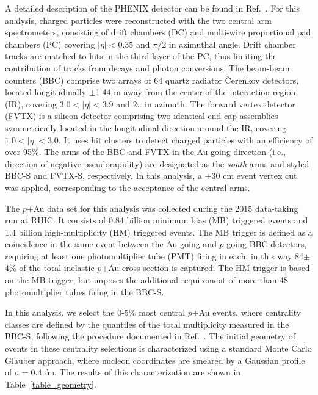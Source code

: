 \documentclass[%
reprint,
showpacs,preprintnumbers,
 amsmath,amssymb,
 aps,
]{revtex4-1}
\newcommand{\pau}{\mbox{$p$+Au}\xspace}
\newcommand{\bbceta}{\mbox{$3.0<|\eta|<3.9$}\xspace}
\begin{document}
A detailed description of the PHENIX detector can be found in Ref.~\cite{Adcox2003469}. For this analysis, charged particles were reconstructed with the two central arm spectrometers, consisting of drift chambers (DC) and multi-wire proportional pad chambers (PC) covering $|\eta|<0.35$ and $\pi/2$ in azimuthal angle. Drift chamber tracks are matched to hits in the third layer of the PC, thus limiting the contribution of tracks from decays and photon conversions. The beam-beam counters (BBC) comprise two arrays of 64 quartz radiator \v{C}erenkov detectors, located longitudinally $\pm$1.44 m away from the center of the interaction region (IR), covering \bbceta and 2$\pi$ in azimuth. The forward vertex detector (FVTX) is a silicon detector comprising two identical end-cap assemblies symmetrically located in the longitudinal direction around the IR, covering $1.0 < |\eta| < 3.0$. It uses hit clusters to detect charged particles with an efficiency of over 95\%.
The arms of the BBC and FVTX in the Au-going direction (i.e., direction of negative pseudorapidity) are designated as the \emph{south} arms and styled BBC-S and FVTX-S, respectively. In this analysis, a $\pm$30 cm event vertex cut was applied, corresponding to the acceptance of the central arms. 

The \pau data set for this analysis was collected during the 2015 data-taking run at RHIC. It consists of 0.84 billion minimum bias (MB) triggered events and 1.4 billion high-multiplicity (HM) triggered events. The MB trigger is defined as a coincidence in the same event between the Au-going and $p$-going BBC detectors, requiring at least one photomultiplier tube (PMT) firing in each; in this way 84$\pm$4\% of the total inelastic \pau cross section is captured. The HM trigger is based on the MB trigger, but imposes the additional requirement of more than 48 photomultiplier tubes firing in the BBC-S. 

In this analysis, we select the 0-5\% most central \pau events, where 
centrality classes are defined by the quantiles of the total multiplicity measured in the BBC-S, following the procedure documented in Ref.~\cite{bbc}.
The initial geometry of events in these centrality selections is characterized using a standard Monte Carlo Glauber approach, where nucleon coordinates are smeared by a Gaussian profile of $\sigma = 0.4$ fm. The results of this characterization are shown in Table~\ref{table_geometry}.
\end{document}
